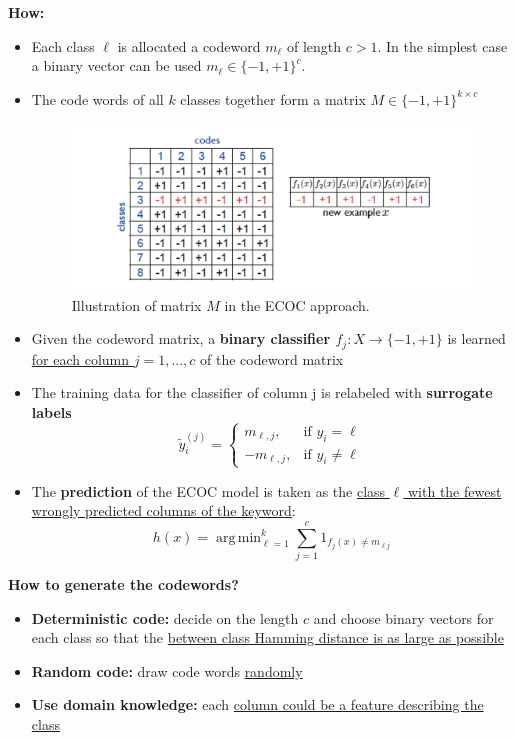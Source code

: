 \documentclass[12pt, a4paper]{article}
\DeclareMathOperator*{\argmin}{arg\,min} %
\begin{document}
\textbf{How:}
\begin{itemize}
  \item Each class $\ell$ is allocated a codeword $m_\ell$ of length $c > 1$. In the simplest case a binary vector can be used $m_\ell \in \{-1, +1\}^c$.
  \item The code words of all $k$ classes together form a matrix $M \in \{-1,+1\}^{k \times c}$
  \begin{figure}[H]
    \centering  %
      \includegraphics[width=1.0\columnwidth]{images/ecoc.png}
      \caption{Illustration of matrix $M$ in the ECOC approach.}
      \label{fig:ecoc}
  \end{figure}
  \item Given the codeword matrix, a \textbf{binary classifier $f_j : X \to \{-1, +1\}$} is learned \uline{for each column $j = 1, ..., c$} of the codeword matrix
  \item The training data for the classifier of column j is relabeled with \textbf{surrogate labels}
  $$
  \tilde{y}_i^{(j)} =
  \begin{cases}
	m_{\ell,j}, & \text{if $y_i = \ell$} \\
  -m_{\ell,j}, & \text{if $y_i \neq \ell$}
	\end{cases}
  $$
  \item The \textbf{prediction} of the ECOC model is taken as the \uline{class $\ell$ with the fewest wrongly predicted columns of the keyword}:
  $$
  h(x) = \argmin_{\ell = 1}^k \sum_{j=1}^c 1_{f_j(x) \neq m_{\ell j}}
  $$
\end{itemize}


\textbf{How to generate the codewords?}

\begin{itemize}
  \item \textbf{Deterministic code:} decide on the length $c$ and choose binary vectors for each class so that the \uline{between class Hamming distance is as large as possible}
  \item \textbf{Random code:} draw code words \uline{randomly}
  \item \textbf{Use domain knowledge:} each \uline{column could be a feature describing the class}
\end{itemize}
\end{document}
